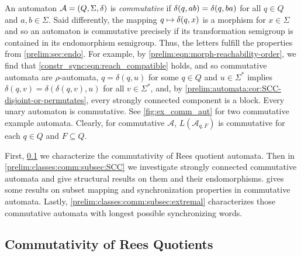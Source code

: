 

An automaton $\mathcal A = (Q, \Sigma, \delta)$ is \emph{commutative} 
if $\delta(q,ab) = \delta(q,ba)$ for all $q \in Q$
and $a,b \in \Sigma$.
Said differently, the mapping $q \mapsto \delta(q,x)$ 
is a morphism for $x \in \Sigma$ 
and so an automaton is commutative precisely if its transformation
semigroup is contained in its endomorphism semigroup.
Thus, the letters fulfill
the properties from \cref{prelim:sec:endo}.
For example, by \cref{prelim:eqn:morph-reachability-order},		
we find that \cref{constr_sync:eqn:reach_compatible}
holds, and so commutative automata are $\rho$-automata, 
$q = \delta(q, u)$ for some $q \in Q$
and $u \in \Sigma^*$
implies $\delta(q, v) = \delta(\delta(q, v), u)$
for all $v \in \Sigma^*$,
and, by \cref{prelim:automata:cor:SCC-disjoint-or-permutates},
every strongly connected component is a block.
Every unary automaton is commutative.
See \cref{fig:ex_comm_aut} for two commutative example automata.
Clearly, for commutative $\mathcal A$,
$L(\mathcal A_{q,F})$ is commutative for each $q \in Q$
and $F \subseteq Q$.

First, \cref{prelim:classes:comm:subsec:rees} we characterize the commutativity of Rees quotient automata.
Then in \cref{prelim:classes:comm:subsec:SCC} we investigate strongly connected commutative automata
and give structural results on them and their endomorphisms.  gives
some results on subset mapping and synchronization properties in commutative automata.
Lastly, \cref{prelim:classes:comm:subsec:extremal} characterizes those commutative
automata with longest possible synchronizing words.

\subsection{Commutativity of Rees Quotients}
\label{prelim:classes:comm:subsec:rees}

